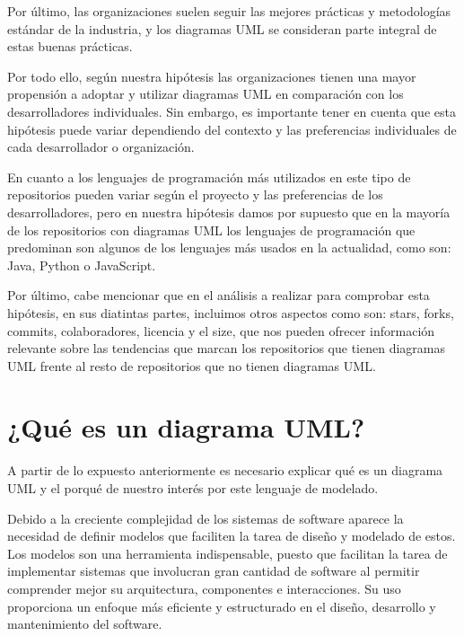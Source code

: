 \documentclass[a4paper, 12pt]{book}
\begin{document}
Por último, las organizaciones suelen seguir las mejores prácticas y metodologías estándar de la industria, y los diagramas UML se consideran parte integral de estas buenas prácticas. 


Por todo ello, según nuestra hipótesis las organizaciones tienen una mayor propensión a adoptar y utilizar diagramas UML en comparación con los desarrolladores individuales. 
Sin embargo, es importante tener en cuenta que esta hipótesis puede variar dependiendo del contexto y las preferencias individuales de cada desarrollador o organización.


En cuanto a los lenguajes de programación más utilizados en este tipo de repositorios pueden variar según el proyecto y las preferencias de los desarrolladores, pero en nuestra hipótesis damos por supuesto que en la mayoría de los repositorios con diagramas UML los lenguajes de programación que predominan son algunos de los lenguajes más usados en la actualidad, como son: Java, Python o JavaScript. 


Por último, cabe mencionar que en el análisis a realizar para comprobar esta hipótesis, en sus diatintas partes, incluimos otros aspectos como son: stars, forks, commits, colaboradores, licencia y el size, que nos pueden ofrecer información relevante sobre las tendencias que marcan los repositorios que tienen diagramas UML frente al resto de repositorios que no tienen diagramas UML.


\section{¿Qué es un diagrama UML?} %
\label{sec:qué es un UML} %

A partir de lo expuesto anteriormente es necesario explicar qué es un diagrama UML y el porqué de nuestro interés por este lenguaje de modelado.


Debido a la creciente complejidad de los sistemas de software aparece la necesidad de definir modelos que faciliten la tarea de diseño y modelado de estos. 
Los modelos son una herramienta indispensable, puesto que facilitan la tarea de implementar sistemas que involucran gran cantidad de software al permitir comprender mejor su arquitectura, componentes e interacciones.
Su uso proporciona un enfoque más eficiente y estructurado en el diseño, desarrollo y mantenimiento del software.
\end{document}
